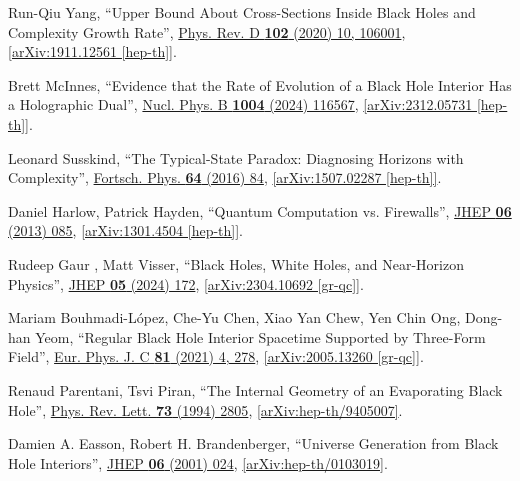 \documentclass[12pt,preprintnumbers, floatfix, preprintnumbers, letterpaper, superscriptaddress,nofootinbib]{revtex4-2}
\begin{document}
\begin{thebibliography}{99}
Run-Qiu Yang, ``Upper Bound About Cross-Sections Inside Black Holes and Complexity Growth Rate'', {\hypersetup{urlcolor=vividviolet}\href{https://journals.aps.org/prd/abstract/10.1103/PhysRevD.102.106001}{Phys. Rev. D \textbf{102} (2020) 10, 106001}}, \href{https://arxiv.org/abs/1911.12561}{[arXiv:1911.12561 [hep-th]]}.

Brett McInnes, ``Evidence that the Rate of Evolution of a Black Hole Interior Has a Holographic Dual'', {\hypersetup{urlcolor=vividviolet}\href{https://www.sciencedirect.com/science/article/pii/S0550321324001330}{Nucl. Phys. B \textbf{1004} (2024) 116567}}, \href{https://arxiv.org/abs/2312.05731}{[arXiv:2312.05731 [hep-th]]}.

Leonard Susskind, ``The Typical-State Paradox: Diagnosing Horizons with Complexity'', {\hypersetup{urlcolor=vividviolet}\href{https://onlinelibrary.wiley.com/doi/10.1002/prop.201500091}{Fortsch. Phys. \textbf{64} (2016) 84}}, \href{https://arxiv.org/abs/1507.02287}{[arXiv:1507.02287 [hep-th]]}.

Daniel Harlow, Patrick Hayden, ``Quantum Computation vs. Firewalls'',  {\hypersetup{urlcolor=vividviolet}\href{https://link.springer.com/article/10.1007/JHEP06(2013)085}{JHEP \textbf{06} (2013) 085}}, \href{https://arxiv.org/abs/1301.4504}{[arXiv:1301.4504 [hep-th]]}.

Rudeep Gaur , Matt Visser, ``Black Holes, White Holes, and Near-Horizon Physics'', {\hypersetup{urlcolor=vividviolet}\href{https://doi.org/10.1007/JHEP05(2024)172}{JHEP \textbf{05} (2024) 172}}, \href{https://arxiv.org/abs/2304.10692}{[arXiv:2304.10692 [gr-qc]]}.

Mariam Bouhmadi-López, Che-Yu Chen, Xiao Yan Chew, Yen Chin Ong, Dong-han Yeom, ``Regular Black Hole Interior Spacetime Supported by Three-Form Field'', {\hypersetup{urlcolor=vividviolet}\href{https://link.springer.com/article/10.1140/epjc/s10052-021-09080-1}{Eur. Phys. J. C \textbf{81} (2021) 4, 278}}, \href{https://arxiv.org/abs/2005.13260}{[arXiv:2005.13260 [gr-qc]]}.

Renaud Parentani, Tsvi Piran, ``The Internal Geometry of an Evaporating Black Hole'', {\hypersetup{urlcolor=vividviolet}\href{https://journals.aps.org/prl/abstract/10.1103/PhysRevLett.73.2805}{Phys. Rev. Lett. \textbf{73} (1994) 2805}}, \href{https://arxiv.org/abs/hep-th/9405007v2}{[arXiv:hep-th/9405007]}.

Damien A. Easson, Robert H. Brandenberger, ``Universe Generation from Black Hole Interiors'', {\hypersetup{urlcolor=vividviolet}\href{https://iopscience.iop.org/article/10.1088/1126-6708/2001/06/024}{JHEP \textbf{06} (2001) 024}}, \href{https://arxiv.org/abs/hep-th/0103019}{[arXiv:hep-th/0103019]}.


\end{thebibliography}
\end{document}
